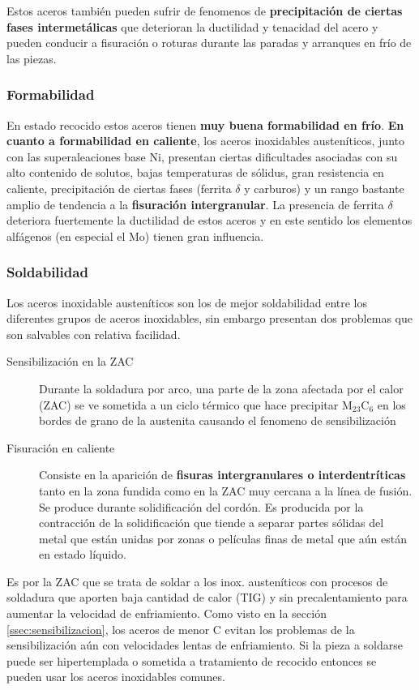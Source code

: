 Estos aceros también pueden sufrir de fenomenos de \textbf{precipitación de ciertas fases intermetálicas} que deterioran la ductilidad y tenacidad del acero y pueden conducir a fisuración o roturas durante las paradas y arranques en frío de las piezas.

\subsubsection{Formabilidad}
En estado recocido estos aceros tienen \textbf{muy buena formabilidad en frío}. \textbf{En cuanto a formabilidad en caliente}, los aceros inoxidables austeníticos, junto con las superaleaciones base Ni, presentan ciertas dificultades asociadas con su alto contenido de solutos, bajas temperaturas de sólidus, gran resistencia en caliente, precipitación de ciertas fases (ferrita $\delta$ y carburos) y un rango bastante amplio de tendencia a la \textbf{fisuración intergranular}. La presencia de ferrita $\delta$ deteriora fuertemente la ductilidad de estos aceros y en este sentido los elementos alfágenos (en especial el Mo) tienen gran influencia.


\subsubsection{Soldabilidad}

Los aceros inoxidable austeníticos son los de mejor soldabilidad entre los diferentes grupos de aceros inoxidables, sin embargo presentan dos problemas que son salvables con relativa facilidad.

\begin{description}
	\item[Sensibilización en la ZAC] Durante la soldadura por arco, una parte de la zona afectada por el calor (ZAC) se ve sometida a un ciclo térmico que hace precipitar M$_{23}$C$_6$ en los bordes de grano de la austenita causando el fenomeno de sensibilización
	\item[Fisuración en caliente] Consiste en la aparición de \textbf{fisuras intergranulares o interdentríticas} tanto en la zona fundida como en la ZAC muy cercana a la línea de fusión. Se produce durante solidificación del cordón. Es producida por la contracción de la solidificación que tiende a separar partes sólidas del metal que están unidas por zonas o películas finas de metal que aún están en estado líquido. 
\end{description}

Es por la ZAC que se trata de soldar a los inox. austeníticos con procesos de soldadura que aporten baja cantidad de calor (TIG) y sin precalentamiento para aumentar la velocidad de enfriamiento. Como visto en la sección \ref{ssec:sensibilizacion}, los aceros de menor C evitan los problemas de la sensibilización aún con velocidades lentas de enfriamiento. Si la pieza a soldarse puede ser hipertemplada o sometida a tratamiento de recocido entonces se pueden usar los aceros inoxidables comunes.


